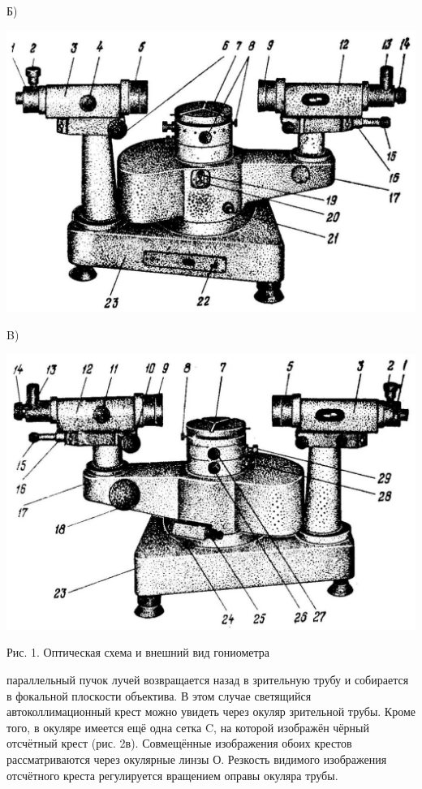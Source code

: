 \documentclass[a4paper,12pt]{article} %
\begin{document}
Б)

\begin{center}
\includegraphics[scale=0.2]{2023_04_02_a48ae02e429ba186bcd7g-2(2)}
\end{center}

B)

\begin{center}
\includegraphics[scale=0.2]{2023_04_02_a48ae02e429ba186bcd7g-2(1)}

Рис. 1. Оптическая схема и внешний вид гониометра

\end{center}

 параллельный пучок лучей возвращается назад в зрительную трубу и собирается в фокальной плоскости объектива. В этом случае светящийся автоколлимационный крест можно увидеть через окуляр зрительной трубы. Кроме того, в окуляре имеется ещё одна сетка C, на которой изображён чёрный отсчётный крест (рис. 2в). Совмещённые изображения обоих крестов рассматриваются через окулярные линзы О. Резкость видимого изображения отсчётного креста регулируется вращением оправы окуляра трубы.
\end{document}
